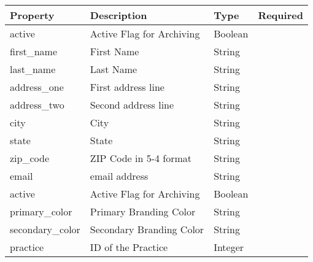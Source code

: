 \documentclass[letterpaper,10pt,english]{sphinxmanual}
\begin{document}
\begin{tabulary}{\linewidth}{|L|L|L|L|}
\hline
\textsf{\relax 
Property
} & \textsf{\relax 
Description
} & \textsf{\relax 
Type
} & \textsf{\relax 
Required
}\\
\hline
active
 & 
Active Flag for Archiving
 & 
Boolean
 & \\

first\_name
 & 
First Name
 & 
String
 & \\

last\_name
 & 
Last Name
 & 
String
 & \\

address\_one
 & 
First address line
 & 
String
 & \\

address\_two
 & 
Second address line
 & 
String
 & \\

city
 & 
City
 & 
String
 & \\

state
 & 
State
 & 
String
 & \\

zip\_code
 & 
ZIP Code in 5-4 format
 & 
String
 & \\

email
 & 
email address
 & 
String
 & \\

active
 & 
Active Flag for Archiving
 & 
Boolean
 & \\

primary\_color
 & 
Primary Branding Color
 & 
String
 & \\

secondary\_color
 & 
Secondary Branding Color
 & 
String
 & \\

practice
 & 
ID of the Practice
 & 
Integer
 & \\
\hline\end{tabulary}
\end{document}
